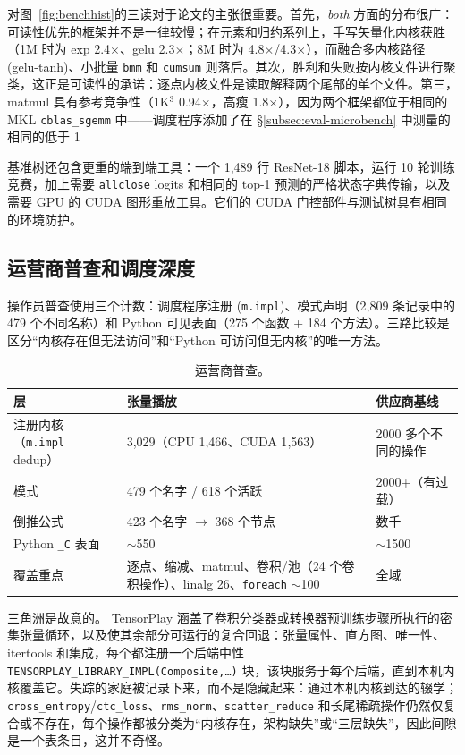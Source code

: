 对图~\ref{fig:benchhist}的三读对于论文的主张很重要。首先，\emph{both} 方面的分布很广：可读性优先的框架并不是一律较慢；在元素和归约系列上，手写矢量化内核获胜（1M 时为 exp 2.4$\times$、gelu 2.3$\times$；8M 时为 4.8$\times$/4.3$\times$），而融合多内核路径 (gelu-tanh)、小批量 \texttt{bmm} 和 \texttt{cumsum} 则落后。其次，胜利和失败按内核文件进行聚类，这正是可读性的承诺：逐点内核文件是读取解释两个尾部的单个文件。第三，matmul 具有参考竞争性（1K$^3$ 0.94$\times$，高瘦 1.8$\times$），因为两个框架都位于相同的 MKL \texttt{cblas\_sgemm} 中——调度程序添加了在 \S\ref{subsec:eval-microbench} 中测量的相同的低于 1%

基准树还包含更重的端到端工具：一个 1{,}489 行 ResNet-18 脚本，运行 10 轮训练竞赛，加上需要 \texttt{allclose} logits 和相同的 top-1 预测的严格状态字典传输，以及需要 GPU 的 CUDA 图形重放工具。它们的 CUDA 门控部件与测试树具有相同的环境防护。

\subsection{运营商普查和调度深度}
\label{subsec:eval-opcount}

操作员普查使用三个计数：调度程序注册 (\texttt{m.impl})、模式声明（2{,}809 条记录中的 479 个不同名称）和 Python 可见表面（275 个函数 + 184 个方法）。三路比较是区分“内核存在但无法访问”和“Python 可访问但无内核”的唯一方法。

\begin{table}[H]
\centering
\caption{运营商普查。}
\label{tab:opcount}
\small
\begin{tabular}{lll}
\toprule
层 & 张量播放 & 供应商基线 \\
\midrule
注册内核（\texttt{m.impl} dedup） & 3{,}029（CPU 1{,}466、CUDA 1{,}563） & 2000 多个不同的操作 \\
模式 & 479 个名字 / 618 个活跃 & 2000+（有过载） \\
倒推公式 & 423 个名字 $\rightarrow$ 368 个节点 & 数千 \\
Python \texttt{\_C} 表面 & $\sim$550 & $\sim$1500 \\
覆盖重点 & 逐点、缩减、matmul、卷积/池（24 个卷积操作）、linalg 26、\texttt{foreach} $\sim$100 & 全域 \\
\bottomrule
\end{tabular}
\end{table}

三角洲是故意的。 TensorPlay 涵盖了卷积分类器或转换器预训练步骤所执行的密集张量循环，以及使其余部分可运行的复合回退：张量属性、直方图、唯一性、itertools 和集成，每个都注册一个后端中性 \texttt{TENSORPLAY\_LIBRARY\_IMPL(Composite,\dots)} 块，该块服务于每个后端，直到本机内核覆盖它。失踪的家庭被记录下来，而不是隐藏起来：通过本机内核到达的辍学； \texttt{cross\_entropy}/\texttt{ctc\_loss}、\texttt{rms\_norm}、\texttt{scatter\_reduce} 和长尾稀疏操作仍然仅复合或不存在，每个操作都被分类为“内核存在，架构缺失”或“三层缺失”，因此间隙是一个表条目，这并不奇怪。

